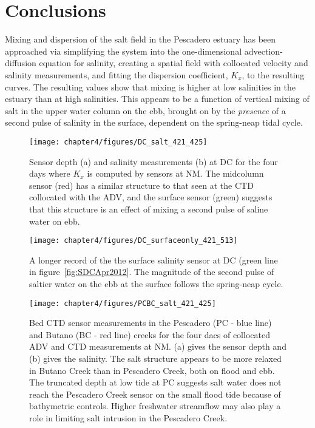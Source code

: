 \section{Conclusions}

Mixing and dispersion of the salt field in the Pescadero estuary has been approached via simplifying the system into the one-dimensional advection-diffusion equation for salinity, creating a spatial field with collocated velocity and salinity measurements, and fitting the dispersion coefficient, $K_x$, to the resulting curves. The resulting values show that mixing is higher at low salinities in the estuary than at high salinities. This appears to be a function of vertical mixing of salt in the upper water column on the ebb, brought on by the \emph{presence} of a second pulse of salinity in the surface, dependent on the spring-neap tidal cycle.  






\begin{figure}
	\texttt{[image: chapter4/figures/DC\_salt\_421\_425]}
	\caption{Sensor depth (a) and salinity measurements (b) at DC for the four days where $K_x$ is computed by sensors at NM. The midcolumn sensor (red) has a similar structure to that seen at the CTD collocated with the ADV, and the surface sensor (green) suggests that this structure is an effect of mixing a second pulse of saline water on ebb.} \label{fig:SDCApr2012} \label{fig:DC_salt_421_425}
\end{figure}


\begin{figure}
	\texttt{[image: chapter4/figures/DC\_surfaceonly\_421\_513]}
	\caption{A longer record of the the surface salinity sensor at DC (green line in figure~\ref{fig:SDCApr2012}. The magnitude of the second pulse of saltier water on the ebb at the surface follows the spring-neap cycle.} \label{fig:SsurfLT}
\end{figure}


\begin{figure}
	\texttt{[image: chapter4/figures/PCBC\_salt\_421\_425]}
	\caption{Bed CTD sensor measurements in the Pescadero (PC - blue line) and Butano (BC  - red line) creeks for the four dacs of collocated ADV and CTD measurements at NM. (a) gives the sensor depth and (b) gives the salinity. The salt structure appears to be more relaxed in Butano Creek than in Pescadero Creek, both on flood and ebb. The truncated depth at low tide at PC suggests salt water does not reach the Pescadero Creek sensor on the small flood tide because of bathymetric controls. Higher freshwater streamflow may also play a role in limiting salt intrusion in the Pescadero Creek.} \label{fig:PCBC421:425}
\end{figure}



